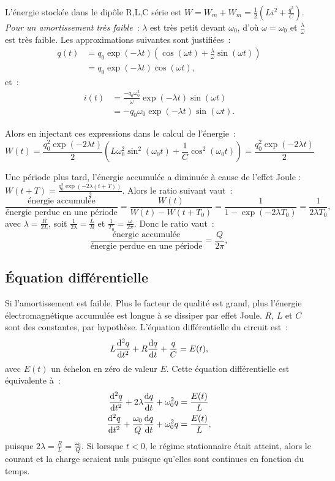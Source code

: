 L'énergie stockée dans le dipôle R,L,C série est \(W = W_m + W_m = \frac{1}{2}\left(Li^2 + \frac{q^2}{C}\right)\). \emph{Pour un amortissement très faible}~: \(\lambda\) est très petit devant \(\omega_0\), d'où \(\omega = \omega_0\) et \(\frac{\lambda}{\omega}\) est très faible. Les approximations suivantes sont justifiées~:
\begin{align}
  q(t) &= q_0 \exp(-\lambda t)\left(\cos(\omega t) + \frac{\lambda}{\omega} \sin(\omega t)\right) \\
  &= q_0 \exp(-\lambda t) \cos(\omega t),
\end{align}
et~:
\begin{align}
  i(t) &= \frac{-q_0\omega_0^2}{\omega}\exp(-\lambda t) \sin(\omega t) \\
  &=-q_0 \omega_0 \exp(-\lambda t) \sin(\omega t).
\end{align}

Alors en injectant ces expressions dans le calcul de l'énergie~:
\begin{equation}
  W(t) = \frac{q_0^2 \exp(-2\lambda t)}{2} \left(L\omega_0^2 \sin^2(\omega_0 t) + \frac{1}{C}\cos^2(\omega_0 t)\right) = \frac{q_0^2 \exp(-2\lambda t)}{2}
\end{equation}

Une période plus tard, l'énergie accumulée a diminuée à cause de l'effet Joule : \(W(t+T) = \frac{q_0^2 \exp(-2\lambda (t+T))}{2}\). Alors le ratio suivant vaut~:
\begin{equation}
  \frac{\text{énergie accumulée}}{\text{énergie perdue en une période}} = \frac{W(t)}{W(t) - W(t+T_0)} = \frac{1}{1 - \exp(-2\lambda T_0)} = \frac{1}{2\lambda T_0},
\end{equation}
avec \(\lambda = \frac{R}{2L}\), soit \(\frac{1}{2\lambda}=\frac{L}{R}\) et \(\frac{1}{T_0} = \frac{\omega}{2\pi}\). Donc le ratio vaut~:
\begin{equation}
  \frac{\text{énergie accumulée}}{\text{énergie perdue en une période}} = \frac{Q}{2\pi},
\end{equation}
\subsection{Équation différentielle}
Si l'amortissement est faible. Plus le facteur de qualité est grand, plus l'énergie électromagnétique accumulée est longue à se dissiper par effet Joule. \(R\), \(L\) et \(C\) sont des constantes, par hypothèse. L'équation différentielle du circuit est~:
\begin{equation}
  L\dfrac{\mathrm{d}^2 q}{\mathrm{d} {t}^2} +R\dfrac{\mathrm{d} q}{\mathrm{d} t} +\frac{q}{C} = E(t),
\end{equation}
avec \(E(t)\) un échelon en zéro de valeur \(E\). Cette équation différentielle est équivalente à~:
\begin{align}
  \dfrac{\mathrm{d}^2 q}{\mathrm{d} {t}^2} + 2\lambda\dfrac{\mathrm{d} q}{\mathrm{d} t} + \omega_0^2 q           &= \frac{E(t)}{L} \\
  \dfrac{\mathrm{d}^2 q}{\mathrm{d} {t}^2} + \frac{\omega_0}{Q}\dfrac{\mathrm{d} q}{\mathrm{d} t} + \omega_0^2 q &= \frac{E(t)}{L},
\end{align}
puisque \(2\lambda = \frac{R}{L} = \frac{\omega_0}{Q}\). Si lorsque \(t<0\), le régime stationnaire était atteint, alors le courant et la charge seraient nuls puisque qu'elles sont continues en fonction du temps.

